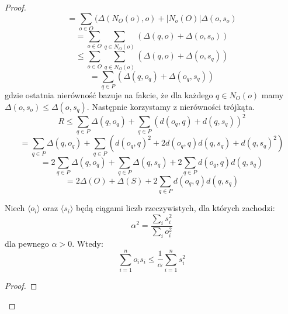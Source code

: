 \begin{proof}
    \begin{equation}
        = \sum_{o \in O} (\Delta(N_{O}(o), o) + |N_{o}(O)| \Delta(o, s_{o})
    \end{equation}
    \begin{equation}
        = \sum_{o \in O} \sum_{q \in N_{O}(o)} (\Delta(q, o) + \Delta(o, s_{o}))
    \end{equation}
    \begin{equation}
        \leq \sum_{o \in O} \sum_{q \in N_{O}(o)} (\Delta(q, o) + \Delta(o, s_{q}))
    \end{equation}
    \begin{equation}
        = \sum_{q \in P} (\Delta(q, o_{q}) + \Delta(o_{q}, s_{q}))
    \end{equation}
    gdzie ostatnia nierówność bazuje na fakcie, że dla każdego $q \in N_{O}(o)$ mamy $\Delta(o, s_{o}) \leq \Delta(o, s_{q})$.
    Następnie korzystamy z nierówności trójkąta.
    \begin{equation}
        R \leq  \sum_{q \in P} \Delta(q, o_{q}) + \sum_{q \in P} ( d(o_{q}, q) + d(q, s_{q}))^{2}
    \end{equation}
    \begin{equation}
        = \sum_{q \in P} \Delta(q, o_{q}) + \sum_{q \in P} ( d(o_{q}, q)^{2} + 2d(o_{q}, q)d(q, s_{q}) + d(q, s_{q})^{2})
    \end{equation}
    \begin{equation}
        = 2\sum_{q \in P} \Delta(q, o_{q}) + \sum_{q \in P} \Delta(q, s_{q}) + 2\sum_{q \in P} d(o_{q}, q)d(q, s_{q})
    \end{equation}
    \begin{equation}
        = 2\Delta(O) + \Delta(S) + 2\sum_{q \in P} d(o_{q}, q)d(q, s_{q})
    \end{equation}
    \begin{lemma}{\cite{10.1145/1007352.1007400}}
        Niech $\langle o_{i} \rangle$ oraz $\langle s_{i} \rangle$ będą ciągami liczb rzeczywistych, dla których zachodzi:
        \begin{equation}
            \alpha^2 = \frac{\sum_{i} s_{i}^{2}}{\sum_{i} o_{i}^{2}}
        \end{equation}
        dla pewnego $\alpha > 0$.
        Wtedy:
        \begin{equation}
            \sum_{i=1}^{n} o_{i} s_{i} \leq \frac{1}{\alpha} \sum_{i=1}^{n} s_{i}^{2}
        \end{equation}
    \end{lemma}
    \begin{proof}

\end{proof}
\end{proof}
